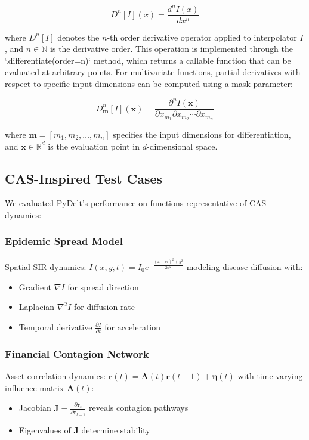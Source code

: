 \documentclass[10pt,journal,compsoc]{IEEEtran}
\begin{document}
\begin{equation}
    D^n[I](x) = \frac{d^n I(x)}{dx^n}
\end{equation}

where $D^n[I]$ denotes the $n$-th order derivative operator applied to interpolator $I$, and $n \in \mathbb{N}$ is the derivative order. This operation is implemented through the `.differentiate(order=n)` method, which returns a callable function that can be evaluated at arbitrary points. For multivariate functions, partial derivatives with respect to specific input dimensions can be computed using a mask parameter:

\begin{equation}
    D^n_{\mathbf{m}}[I](\mathbf{x}) = \frac{\partial^n I(\mathbf{x})}{\partial x_{m_1} \partial x_{m_2} \cdots \partial x_{m_n}}
\end{equation}

where $\mathbf{m} = [m_1, m_2, \ldots, m_n]$ specifies the input dimensions for differentiation, and $\mathbf{x} \in \mathbb{R}^d$ is the evaluation point in $d$-dimensional space.

\subsection{CAS-Inspired Test Cases}

We evaluated PyDelt's performance on functions representative of CAS dynamics:

\subsubsection{Epidemic Spread Model}

Spatial SIR dynamics: $I(x,y,t) = I_0 e^{-\frac{(x-vt)^2 + y^2}{2\sigma^2}}$ modeling disease diffusion with:
\begin{itemize}
    \item Gradient $\nabla I$ for spread direction
    \item Laplacian $\nabla^2 I$ for diffusion rate
    \item Temporal derivative $\frac{\partial I}{\partial t}$ for acceleration
\end{itemize}

\subsubsection{Financial Contagion Network}

Asset correlation dynamics: $\mathbf{r}(t) = \mathbf{A}(t)\mathbf{r}(t-1) + \boldsymbol{\eta}(t)$ with time-varying influence matrix $\mathbf{A}(t)$:
\begin{itemize}
    \item Jacobian $\mathbf{J} = \frac{\partial \mathbf{r}_t}{\partial \mathbf{r}_{t-1}}$ reveals contagion pathways
    \item Eigenvalues of $\mathbf{J}$ determine stability
\end{itemize}
\end{document}
